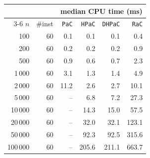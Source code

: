 \begin{tabular}{@{}rrrrrr@{}}
\toprule
 &  & \multicolumn{4}{c}{median CPU time (ms)} \\
\cmidrule(l){3-6}
$n$ & \#inst & \texttt{PaC} & \texttt{HPaC} & \texttt{DHPaC} & \texttt{RaC} \\
\midrule
100 & 60 & 0.1 & 0.1 & 0.1 & 0.4 \\
200 & 60 & 0.2 & 0.2 & 0.2 & 0.9 \\
500 & 60 & 0.9 & 0.6 & 0.7 & 2.3 \\
1\,000 & 60 & 3.1 & 1.3 & 1.4 & 4.9 \\
2\,000 & 60 & 11.2 & 2.6 & 2.7 & 10.1 \\
5\,000 & 60 & -- & 6.8 & 7.2 & 27.3 \\
10\,000 & 60 & -- & 14.3 & 15.0 & 57.5 \\
20\,000 & 60 & -- & 32.0 & 32.1 & 123.1 \\
50\,000 & 60 & -- & 92.3 & 92.5 & 315.6 \\
100\,000 & 60 & -- & 205.6 & 211.1 & 663.7 \\
\bottomrule
\end{tabular}
